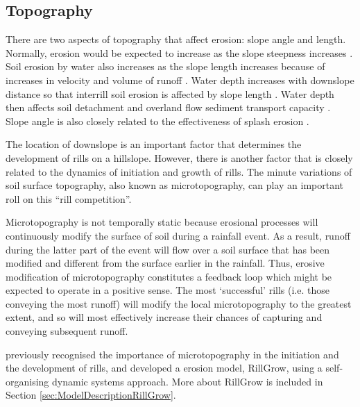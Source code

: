 \subsection{Topography}
\label{sec:Topography}

There are two aspects of topography that affect erosion: slope angle and length.
Normally, erosion would be expected to increase as the slope steepness increases
\citep{liu1994-1835}. Soil erosion by water also increases as the slope length
increases because of increases in velocity and volume of runoff
\citep{liu2000-1759}. Water depth increases with downslope distance so that
interrill soil erosion is affected by slope length \citep{gilley1985-154}.
Water depth then affects soil detachment and overland flow sediment transport
capacity \citep{gilley1985-147}. Slope angle is also closely related to the
effectiveness of splash erosion \citep{kinnell2000-discourse,vandijk2003-153}.

The location of downslope is an important factor that determines the
development of rills on a hillslope. However, there is another factor that is
closely related to the dynamics of initiation and growth of rills. The
minute variations of soil surface topography, also known as microtopography, can
play an important roll on this ``rill competition''.

Microtopography is not temporally static because erosional processes will
continuously modify the surface of soil during a rainfall event. As a
result, runoff during the latter part of the event will flow over a soil
surface that has been modified and different from the surface earlier in the
rainfall. Thus, erosive modification of microtopography constitutes a feedback
loop which might be expected to operate in a positive sense. The most
`successful' rills (i.e. those conveying the most runoff) will modify the local
microtopography to the greatest extent, and so will most effectively increase
their chances of capturing and conveying subsequent runoff.

\citet{favis2000-2173} previously recognised the importance of microtopography
in the initiation and the development of rills, and developed a erosion model,
RillGrow, using a self-organising dynamic systems approach. More about RillGrow
is included in Section \ref{sec:ModelDescriptionRillGrow}.

